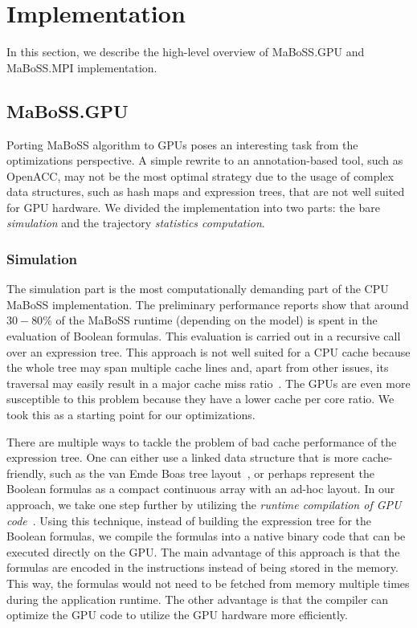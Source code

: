 \documentclass[times, twoside]{zHenriquesLab-StyleBioRxiv}
\begin{document}
\section*{Implementation}\label{sec:implementation}

In this section, we describe the high-level overview of MaBoSS.GPU and MaBoSS.MPI implementation.

\subsection*{MaBoSS.GPU}
Porting MaBoSS algorithm to GPUs poses an interesting task from the optimizations perspective. A simple rewrite to an annotation-based tool, such as OpenACC, may not be the most optimal strategy due to the usage of complex data structures, such as hash maps and expression trees, that are not well suited for GPU hardware. We divided the implementation into two parts: the bare \emph{simulation} and the trajectory \emph{statistics computation}. 

\subsubsection*{Simulation}

The simulation part is the most computationally demanding part of the CPU MaBoSS implementation. The preliminary performance reports show that around $30-80\%$ of the MaBoSS runtime (depending on the model) is spent in the evaluation of Boolean formulas. This evaluation is carried out in a recursive call over an expression tree. This approach is not well suited for a CPU cache because the whole tree may span multiple cache lines and, apart from other issues, its traversal may easily result in a major cache miss ratio~\cite{karlsson2000prefetching}. The GPUs are even more susceptible to this problem because they have a lower cache per core ratio. We took this as a starting point for our optimizations.

There are multiple ways to tackle the problem of bad cache performance of the expression tree. One can either use a linked data structure that is more cache-friendly, such as the van Emde Boas tree layout~\cite{van1975preserving}, or perhaps represent the Boolean formulas as a compact continuous array with an ad-hoc layout. In our approach, we take one step further by utilizing the \emph{runtime compilation of GPU code}~\cite{nvrtc}. Using this technique, instead of building the expression tree for the Boolean formulas, we compile the formulas into a native binary code that can be executed directly on the GPU. The main advantage of this approach is that the formulas are encoded in the instructions instead of being stored in the memory. This way, the formulas would not need to be fetched from memory multiple times during the application runtime. The other advantage is that the compiler can optimize the GPU code to utilize the GPU hardware more efficiently. 
\end{document}
